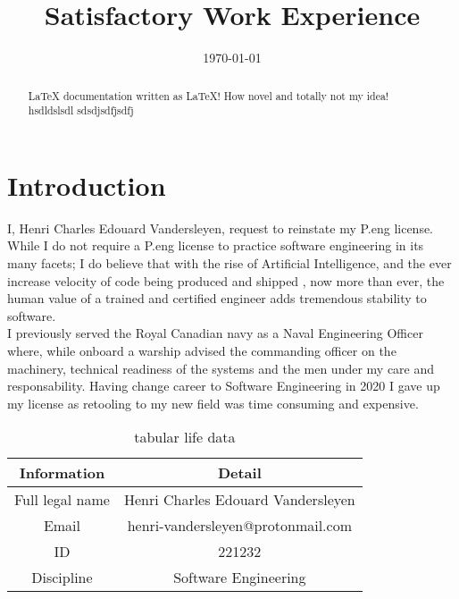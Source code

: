\documentclass[12pt]{article}
\title{Satisfactory Work Experience}
\author{\fullname}
\date{\today}
\def\fullname{Henri Charles Edouard Vandersleyen}
\begin{document}
\maketitle

\newpage
\tableofcontents

\newpage
\section{Introduction}
I, \fullname, request to reinstate my P.eng license. While I do not require a
P.eng license to practice software engineering in its many facets; I do believe
that with the rise of Artificial Intelligence, and the ever increase velocity of
code being produced and shipped
, now more than ever, the human value of a trained and certified engineer adds
tremendous stability to software. \\
I previously served the Royal Canadian navy as a Naval Engineering Officer
where, while onboard a warship advised the commanding officer on the machinery,
technical readiness of the systems and the men under my care and responsability.
Having change career to Software Engineering in 2020 I gave up my license
as retooling to my new field was time consuming and expensive.\\


\begin{abstract}
 \LaTeX{} documentation written as \LaTeX! How novel and totally not
 my idea!
 hsdldslsdl
 sdsdjsdfjsdfj
\end{abstract}
\begin{Applicant Information}
\begin{table}[H]
  \begin{tabular}{c|c}  %
    Information &  Detail \\ %
    \hline %
    Full legal name & \fullname  \\
    Email & henri-vandersleyen@protonmail.com \\
    ID & 221232 \\
    Discipline & Software Engineering
  \end{tabular}
  \caption{tabular life data}
\end{table}
\end{Applicant Information}
\end{document}
